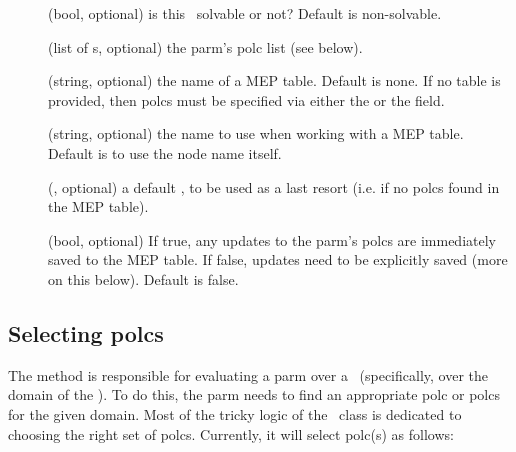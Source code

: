   \begin{description}

  \item[] (bool, optional) is this \Parm\ solvable or not?
    Default is non-solvable.

  \item[] (list of \Polc{}s, optional) the parm's polc list (see below).

  \item[] (string, optional) the name of a MEP table. Default is none.
    If no table is provided, then polcs must be specified via either the
     or the  field.

  \item[] (string, optional) the name to use when working with a MEP
    table. Default is to use the node name itself.

  \item[] (\Polc, optional) a default \Polc, to be used as a last
    resort (i.e. if no polcs found in the MEP table).

  \item[] (bool, optional) If true, any updates to the parm's 
    polcs are immediately saved to the MEP table. If false, updates need to be
    explicitly saved (more on this below). Default is false.

  \end{description}
  
\subsection{Selecting polcs}

  The  method is responsible for evaluating a parm over a
  \Cells\ (specifically, over the domain of the \Cells). To do this, the parm
  needs to find an appropriate polc or polcs for the given domain. Most of the
  tricky logic of the \Parm\ class is dedicated to choosing the right set of
  polcs.  Currently, it will select polc(s) as follows:

